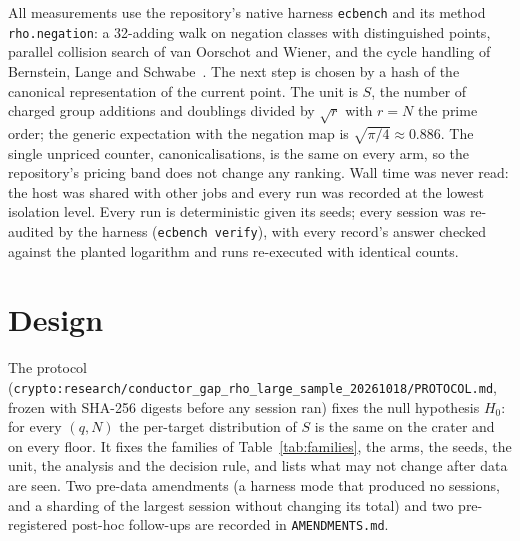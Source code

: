 \documentclass[10pt,a4paper]{article}
\newcommand{\artefact}[1]{\texttt{\small #1}}
\theoremstyle{remark}
\begin{document}
All measurements use the repository's native harness \texttt{ecbench} and
its method \texttt{rho.negation}: a 32-adding walk on negation classes
with distinguished points, parallel collision search of
van Oorschot and Wiener, and the cycle handling of Bernstein, Lange and
Schwabe~\cite{BernsteinLangeSchwabe2011}. The next step is chosen by a
hash of the canonical representation of the current point. The unit is
$S$, the number of charged group additions and doublings divided by
$\sqrt r$ with $r = N$ the prime order; the generic expectation with the
negation map is $\sqrt{\pi/4} \approx 0.886$. The single unpriced counter,
canonicalisations, is the same on every arm, so the repository's pricing
band does not change any ranking. Wall time was never read: the host was
shared with other jobs and every run was recorded at the lowest isolation
level. Every run is deterministic given its seeds; every session was
re-audited by the harness (\texttt{ecbench verify}), with every record's
answer checked against the planted logarithm and runs re-executed with
identical counts.

\section{Design}

The protocol (\artefact{crypto:research/conductor\_gap\_rho\_large\_sample\_20261018/PROTOCOL.md},
frozen with SHA-256 digests before any session ran) fixes the null
hypothesis $H_0$: for every $(q, N)$ the per-target distribution of $S$ is
the same on the crater and on every floor. It fixes the families of
Table~\ref{tab:families}, the arms, the seeds, the unit, the analysis and
the decision rule, and lists what may not change after data are seen.
Two pre-data amendments (a harness mode that produced no sessions, and a
sharding of the largest session without changing its total) and two
pre-registered post-hoc follow-ups are recorded in
\artefact{AMENDMENTS.md}.
\end{document}
